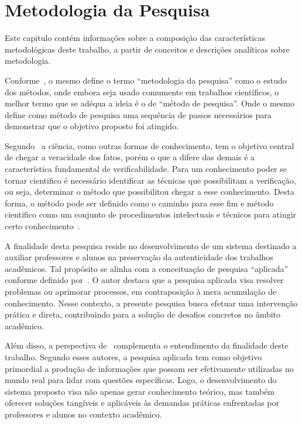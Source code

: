 \chapter{Metodologia da Pesquisa}\label{ch:metodologia-da-pesquisa}

Este capitulo contém informações sobre a composição das
características metodológicas deste trabalho, a partir de conceitos e
descrições analíticas sobre metodologia.

Conforme~\textcite{wazlawick2009}, o mesmo define o termo
“metodologia da pesquisa” como o estudo dos métodos, onde embora
seja usado comumente em trabalhos científicos, o melhor termo que
se adéqua a ideia é o de “método de pesquisa”.
Onde o mesmo define como método de pesquisa uma sequência de passos
necessários para demonstrar que o objetivo proposto foi atingido.

Segundo~\textcite{gil2017} a ciência, como outras formas de
conhecimento, tem o objetivo central de chegar a veracidade dos
fatos, porém o que a difere das demais é a característica fundamental
de verificabilidade.
Para um conhecimento poder se tornar cientifico é necessário
identificar as técnicas que possibilitam a verificação, ou seja,
determinar o método que possibilitou chegar a esse conhecimento.
Desta forma, o método pode ser definido como o caminho para esse fim
e método cientifico como um conjunto de procedimentos intelectuais
e técnicos para atingir certo conhecimento~\cite{gil2017}.

A finalidade desta pesquisa reside no desenvolvimento de um sistema destinado a
auxiliar professores e alunos na preservação da autenticidade dos trabalhos
acadêmicos.
Tal propósito se alinha com a conceituação de pesquisa “aplicada” conforme
definido por~\textcite{gil2017}.
O autor destaca que a pesquisa aplicada visa resolver problemas ou aprimorar
processos, em contraposição à mera acumulação de conhecimento.
Nesse contexto, a presente pesquisa busca efetuar uma intervenção prática e
direta, contribuindo para a solução de desafios concretos no âmbito acadêmico.

Além disso, a perspectiva de~\textcite{prodanov2013} complementa o entendimento
da finalidade deste trabalho.
Segundo esses autores, a pesquisa aplicada tem como objetivo primordial a
produção de informações que possam ser efetivamente utilizadas no mundo real
para lidar com questões específicas.
Logo, o desenvolvimento do sistema proposto visa não apenas gerar conhecimento
teórico, mas também oferecer soluções tangíveis e aplicáveis às demandas
práticas enfrentadas por professores e alunos no contexto acadêmico.

